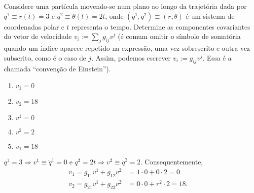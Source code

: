 \begin{question}
    Considere uma partícula movendo-se num plano ao longo da trajetória dada por $q^1 \equiv r(t) = 3$ e $q^2 \equiv \theta(t) = 2t$, onde $(q^1, q^2) \equiv (r,\theta)$ é um sistema de coordenadas polar e $t$ representa o tempo.
    Determine as componentes covariantes do vetor de velocidade $v_i := \sum_{j} g_{ij} v^j$ (é comum omitir o símbolo de somatória quando um índice aparece repetido na expressão, uma vez sobrescrito e outra vez subscrito, como é o caso de $j$. Assim, podemos escrever $v_i := g_{ij} v^j$. Essa é a chamada ``convenção de Einstein'').
    \begin{enumerate}
      \item $v_1 = 0$ \rightanswer
      \item $v_2 = 18$ \rightanswer
      \item $v^1 = 0$
      \item $v^2 = 2$
      \item $v_1 = 18$
    \end{enumerate}

    \begin{solution}
      $q^1 = 3 \Rightarrow v^1 \equiv \dot q^1 = 0$ e $q^2 = 2t \Rightarrow v^2 \equiv \dot q^2 = 2$.
      Consequentemente,
      \begin{align*}
        v_1 = g_{11} v^1 + g_{12} v^2 &= 1 \cdot 0 + 0 \cdot 2 = 0 \\
        v_2 = g_{21} v^1 + g_{22} v^2 &= 0 \cdot 0 + r^2 \cdot 2  = 18.
      \end{align*}
    \end{solution}
\end{question}